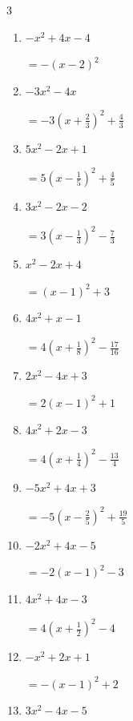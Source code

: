 \begin{multicols}{3}
\begin{enumerate}
  \item $-x^{2}+4x-4$

        $\displaystyle =-\left( x-2\right)^{2}$

  \item $-3x^{2}-4x$

        $\displaystyle =-3\left( x+\frac{2}{3}\right)^{2}+\frac{4}{3}$

  \item $5x^{2}-2x+1$

        $\displaystyle =5\left( x-\frac{1}{5}\right)^{2}+\frac{4}{5}$

  \item $3x^{2}-2x-2$

        $\displaystyle =3\left( x-\frac{1}{3}\right)^{2}-\frac{7}{3}$

\columnbreak %

  \item $x^{2}-2x+4$

        $\displaystyle =\left( x-1\right)^{2}+3$

  \item $4x^{2}+x-1$

        $\displaystyle =4\left( x+\frac{1}{8}\right)^{2}-\frac{17}{16}$

  \item $2x^{2}-4x+3$

        $\displaystyle =2\left( x-1\right)^{2}+1$

  \item $4x^{2}+2x-3$

        $\displaystyle =4\left( x+\frac{1}{4}\right)^{2}-\frac{13}{4}$

  \item $-5x^{2}+4x+3$

        $\displaystyle =-5\left( x-\frac{2}{5}\right)^{2}+\frac{19}{5}$

\columnbreak %

  \item $-2x^{2}+4x-5$

        $\displaystyle =-2\left( x-1\right)^{2}-3$

  \item $4x^{2}+4x-3$

        $\displaystyle =4\left( x+\frac{1}{2}\right)^{2}-4$

  \item $-x^{2}+2x+1$

        $\displaystyle =-\left( x-1\right)^{2}+2$

  \item $3x^{2}-4x-5$


\end{enumerate}
\end{multicols}
